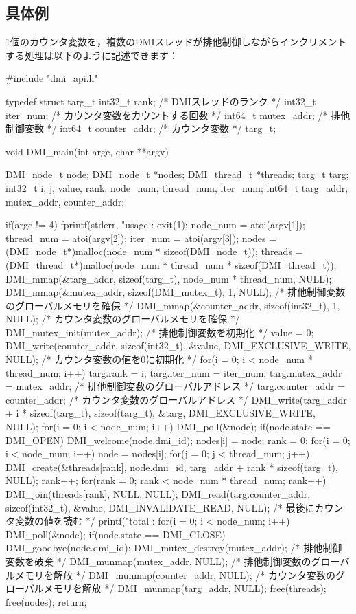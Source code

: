 \documentclass[report,12pt]{jsbook}
\begin{document}
\subsection{具体例}

1個のカウンタ変数を，複数のDMIスレッドが排他制御しながらインクリメントする処理は以下のように記述できます：
\begin{code}
#include "dmi_api.h"

typedef struct targ_t
{
  int32_t rank;  /* DMIスレッドのランク */
  int32_t iter_num;  /* カウンタ変数をカウントする回数 */
  int64_t mutex_addr;  /* 排他制御変数 */
  int64_t counter_addr;  /* カウンタ変数 */
}targ_t;

void DMI_main(int argc, char **argv)
{
  DMI_node_t node;
  DMI_node_t *nodes;
  DMI_thread_t *threads;
  targ_t targ;
  int32_t i, j, value, rank, node_num, thread_num, iter_num;
  int64_t targ_addr, mutex_addr, counter_addr;
  
  if(argc != 4)
    {
      fprintf(stderr, "usage : %
      exit(1);
    }
  node_num = atoi(argv[1]);
  thread_num = atoi(argv[2]);
  iter_num = atoi(argv[3]);
  nodes = (DMI_node_t*)malloc(node_num * sizeof(DMI_node_t));
  threads = (DMI_thread_t*)malloc(node_num * thread_num * sizeof(DMI_thread_t));
  DMI_mmap(&targ_addr, sizeof(targ_t), node_num * thread_num, NULL);
  DMI_mmap(&mutex_addr, sizeof(DMI_mutex_t), 1, NULL);  /* 排他制御変数のグローバルメモリを確保 */
  DMI_mmap(&counter_addr, sizeof(int32_t), 1, NULL);  /* カウンタ変数のグローバルメモリを確保 */
  DMI_mutex_init(mutex_addr);  /* 排他制御変数を初期化 */
  value = 0;
  DMI_write(counter_addr, sizeof(int32_t), &value, DMI_EXCLUSIVE_WRITE, NULL);  /* カウンタ変数の値を0に初期化 */
  for(i = 0; i < node_num * thread_num; i++)
    {
      targ.rank = i;
      targ.iter_num = iter_num;
      targ.mutex_addr = mutex_addr;  /* 排他制御変数のグローバルアドレス */
      targ.counter_addr = counter_addr;  /* カウンタ変数のグローバルアドレス */
      DMI_write(targ_addr + i * sizeof(targ_t), sizeof(targ_t), &targ, DMI_EXCLUSIVE_WRITE, NULL);
    }
  for(i = 0; i < node_num; i++)
    {
      DMI_poll(&node);
      if(node.state == DMI_OPEN)
        {
          DMI_welcome(node.dmi_id);
          nodes[i] = node;
        }
    }
  rank = 0;
  for(i = 0; i < node_num; i++)
    {
      node = nodes[i];
      for(j = 0; j < thread_num; j++)
        {
          DMI_create(&threads[rank], node.dmi_id, targ_addr + rank * sizeof(targ_t), NULL);
          rank++;
        }
    }
  for(rank = 0; rank < node_num * thread_num; rank++)
    {
      DMI_join(threads[rank], NULL, NULL);
    }
  DMI_read(targ.counter_addr, sizeof(int32_t), &value, DMI_INVALIDATE_READ, NULL);  /* 最後にカウンタ変数の値を読む */
  printf("total : %
  for(i = 0; i < node_num; i++)
    {
      DMI_poll(&node);
      if(node.state == DMI_CLOSE)
        {
          DMI_goodbye(node.dmi_id);
        }
    }
  DMI_mutex_destroy(mutex_addr);  /* 排他制御変数を破棄 */
  DMI_munmap(mutex_addr, NULL);  /* 排他制御変数のグローバルメモリを解放 */
  DMI_munmap(counter_addr, NULL);  /* カウンタ変数のグローバルメモリを解放 */
  DMI_munmap(targ_addr, NULL);
  free(threads);
  free(nodes);
  return;
}


\end{code}
\end{document}
